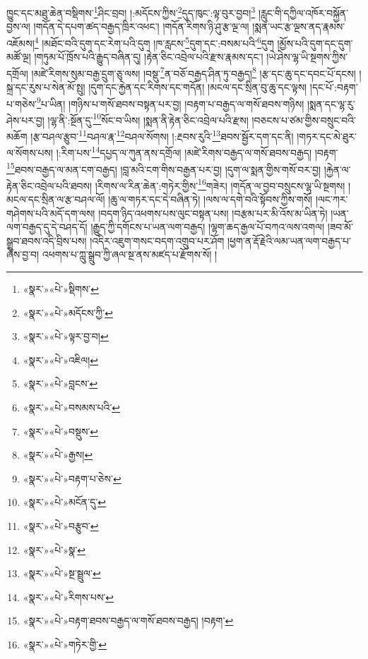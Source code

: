 ཁྱུང་དང་མཐུ་ཆེན་བསྡིགས་\footnote{«སྣར་»«པེ་»སྡིགས་}ཤིང་བྲབ། །:མདོངས་ཀྱིས་\footnote{«སྣར་»«པེ་»མདོངས་ཀྱི་}དུད་ཁུང་:ལྟ་བུར་བྱབ།\footnote{«སྣར་»«པེ་»ལྟར་བྱ་བ།} །རླུང་གི་དཀྱིལ་འཁོར་བསྐྱོན་བྱས་ལ། །གདོན་དེ་དཔག་ཚད་བརྒྱད་ཁྲིར་འཕང་། །གདོན་རིགས་ཉི་ཤུ་རྩ་ལྔ་ལ། །སྨན་ཡང་རྩ་ལྔས་ནད་རྣམས་འཇོམས།\footnote{«སྣར་»«པེ་»འཇིལ།} །མཐོང་བའི་དུག་དང་རེག་པའི་དུག །ཁ་རླངས་\footnote{«སྣར་»«པེ་»བླངས་}དུག་དང་:བསམ་པའི་\footnote{«སྣར་»«པེ་»བསམས་པའི་}དུག །མྱོས་པའི་དུག་དང་དུག་མཚོ་ལྔ། །གཏུམ་པོ་ཁྲོས་པའི་རྒྱུད་བཞིན་དུ། །རྟེན་ཅིང་འབྲེལ་པའི་རྫས་རྣམས་དང་། །ཡེ་ཤེས་ལྷ་ཡི་སྔགས་ཀྱིས་དགྲོལ། །མཛེ་རིགས་སུམ་བརྒྱ་དྲུག་ཅུ་ལས། །བསྡུ་\footnote{«སྣར་»«པེ་»བསྡུས་}ན་བཅོ་བརྒྱད་ཤིན་ཏུ་བརྒྱད།\footnote{«སྣར་»«པེ་»རྒྱས།} །རྩ་དང་ཆུ་དང་དབང་པོ་དངས། །སྐྲ་དང་རུས་པ་སེན་མོ་སྤུ། །དུག་དང་རྐྱེན་དང་རིགས་དང་གདོན། །མངལ་དང་སྲིན་བུ་ཆུ་དང་ལྟས། །དང་པོ་:བརྟག་པ་གཅེས་\footnote{«སྣར་»«པེ་»བརྟག་པ་ཅེས་}པ་ཡིན། །གཉིས་པ་གསོ་ཐབས་བསྟན་པར་བྱ། །བརྟག་པ་བརྒྱད་ལ་གསོ་ཐབས་གཉིས། །སྨན་དང་ལྷ་རུ་ཤེས་པར་བྱ། །ལྷ་ནི་:སྔོན་དུ་\footnote{«སྣར་»«པེ་»མངོན་དུ་}སོང་བ་ཡིས། །སྨན་ནི་རྟེན་ཅིང་འབྲེལ་པའི་རྫས། །བཅངས་པ་ཙམ་གྱིས་བསྲུང་བའི་མཆོག །རྩ་བཤལ་རྩུབ་\footnote{«སྣར་»«པེ་»བརྩུབ་}བཤལ་རྣ་\footnote{«སྣར་»«པེ་»སྣ་}བཤལ་སོགས། །:རྔབས་རུའི་\footnote{«སྣར་»«པེ་»སྔ་སྦྲུལ་}ཐབས་སྦྱོར་དག་དང་ནི། །གཏར་དང་མེ་ཐུར་ལ་སོགས་པས། །:རིག་པས་\footnote{«སྣར་»«པེ་»རིགས་པས་}དཔྱད་ལ་ཀུན་ནས་དགྲོལ། །མཛེ་རིགས་བརྒྱད་ལ་གསོ་ཐབས་བརྒྱད། །བརྟག་\footnote{«སྣར་»«པེ་»བརྟག་ཐབས་བརྒྱད་ལ་གསོ་ཐབས་བརྒྱད། །བརྟག་}ཐབས་བརྒྱད་ལ་མན་ངག་བརྒྱད། །བླ་མའི་ངག་གིས་བརྒྱན་པར་བྱ། །དུག་ལ་སྨན་གྱིས་གསོ་བར་བྱ། །རྐྱེན་ལ་རྟེན་ཅིང་འབྲེལ་པའི་ཐབས། །རིགས་ལ་རིན་ཆེན་:གཏེར་གྱིས་\footnote{«སྣར་»«པེ་»གཏེར་གྱི་}གཟེར། །གདོན་ལ་བྱབ་བསྲུངས་ལྷ་ཡི་སྔགས། །མངལ་དང་སྲིན་ལ་རྩ་བཤལ་ལོ། །ཆུ་ལ་གཏར་དང་དེ་བཞིན་ཏེ། །ལས་ལ་དགེ་བའི་སྟོབས་ཀྱིས་གསོ། །ལང་ཀར་གཤེགས་པའི་མདོ་དག་ལས། །བདག་ཉིད་འཕགས་པས་ལུང་བསྟན་པས། །བརྩམ་པར་མི་འོས་མ་ཡིན་ཏེ། །ཡན་ལག་བརྒྱད་དུ་དེ་བཤད་དོ། །རྒྱུད་ཀྱི་དགོངས་པ་ཡན་ལག་བརྒྱད། །ལྷག་ཆད་རྒྱལ་པོ་བཀའ་ལས་འགལ། །ཟབ་མོ་སྒྲུབ་ཐབས་འདི་བྲིས་པས། །འདིར་འཇུག་གསང་བདག་འགྲུབ་པར་ཤོག །ཕྱག་ན་རྡོ་རྗེའི་ལམ་ཡན་ལག་བརྒྱད་པ་ཞེས་བྱ་བ། འཕགས་པ་ཀླུ་སྒྲུབ་ཀྱི་ཞལ་སྔ་ནས་མཛད་པ་རྫོགས་སོ། ། 